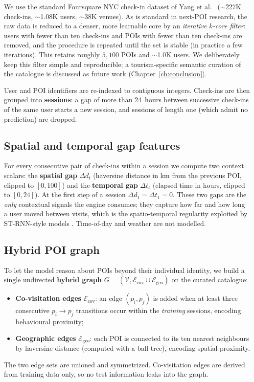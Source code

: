 We use the standard Foursquare NYC check-in dataset of Yang et al.~\cite{yang2015foursquare}
($\sim$227K check-ins, $\sim$1.08K users, $\sim$38K venues). As is standard in next-POI
research, the raw data is reduced to a denser, more learnable core by an \emph{iterative
$k$-core filter}: users with fewer than ten check-ins and POIs with fewer than ten check-ins
are removed, and the procedure is repeated until the set is stable (in practice a few
iterations). This retains roughly $5{,}100$ POIs and $\sim$1.0K users. We deliberately keep
this filter simple and reproducible; a tourism-specific semantic curation of the catalogue is
discussed as future work (Chapter~\ref{ch:conclusion}).

User and POI identifiers are re-indexed to contiguous integers. Check-ins are then grouped
into \textbf{sessions}: a gap of more than 24~hours between successive check-ins of the same
user starts a new session, and sessions of length one (which admit no prediction) are dropped.

\subsection{Spatial and temporal gap features}
\label{sec:sol-data-context}

For every consecutive pair of check-ins within a session we compute two context scalars: the
\textbf{spatial gap} $\Delta d_t$ (haversine distance in km from the previous POI, clipped to
$[0,100]$) and the \textbf{temporal gap} $\Delta t_t$ (elapsed time in hours, clipped to
$[0,24]$). At the first step of a session $\Delta d_1=\Delta t_1=0$. These two gaps are the
\emph{only} contextual signals the engine consumes; they capture how far and how long a user
moved between visits, which is the spatio-temporal regularity exploited by ST-RNN-style models
\cite{liu2016strnn}. Time-of-day and weather are not modelled.

\subsection{Hybrid POI graph}
\label{sec:sol-data-graph}

To let the model reason about POIs beyond their individual identity, we build a single
undirected \textbf{hybrid graph} $G=(\mathcal{V},\mathcal{E}_{\mathrm{cov}}\cup
\mathcal{E}_{\mathrm{geo}})$ on the curated catalogue:
\begin{itemize}[leftmargin=*]
  \item \textbf{Co-visitation edges} $\mathcal{E}_{\mathrm{cov}}$: an edge $(p_i,p_j)$ is added
        when at least three consecutive $p_i\!\rightarrow\!p_j$ transitions occur within the
        \emph{training} sessions, encoding behavioural proximity;
  \item \textbf{Geographic edges} $\mathcal{E}_{\mathrm{geo}}$: each POI is connected to its
        ten nearest neighbours by haversine distance (computed with a ball tree), encoding
        spatial proximity.
\end{itemize}
The two edge sets are unioned and symmetrized. Co-visitation edges are derived from training
data only, so no test information leaks into the graph.

